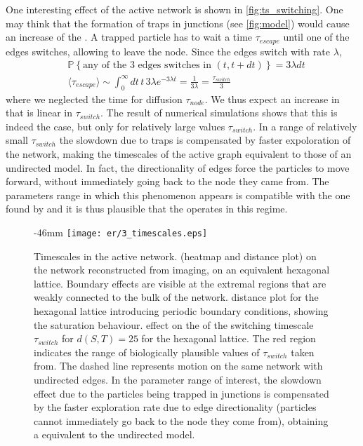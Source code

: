 One interesting effect of the active network is shown in \cref{fig:ts_switching}. One may think that the formation of traps in junctions (see \cref{fig:model}) would cause an increase of the . A trapped particle has to wait a time $\tau_{escape}$ until one of the edges switches, allowing to leave the node. Since the edges switch with rate $\lambda$,
\begin{align}
  &\mathbb{P}\left\{ \text{any of the 3 edges switches in }(t, t + dt)\right\} = 3\lambda dt\\
  &\langle \tau_{escape}\rangle \sim \int_{0}^{\infty} dt \,t\,3\lambda e^{-3\lambda t} = \frac{1}{3\lambda} = \frac{\tau_{switch}}{3}
\end{align}
where we neglected the time for diffusion $\tau_{node}$. We thus expect an increase in  that is linear in $\tau_{switch}$. The result of numerical simulations shows that this is indeed the case, but only for relatively large values $\tau_{switch}$. In a range of relatively small $\tau_{switch}$ the slowdown due to traps is compensated by faster expoloration of the network, making the timescales of the active graph equivalent to those of an undirected model. In fact, the directionality of edges force the particles to move forward, without immediately going back to the node they came from. The parameters range in which this phenomenon appears is compatible with the one found by and it is thus plausible that the  operates in this regime.

\begin{figure}
  \begin{adjustwidth*}{}{-46mm}
    \texttt{[image: er/3\_timescales.eps]}%
    {{\label{fig:ts_er}}%
    {\label{fig:ts_hex}}%
    {\label{fig:ts_hex_pbc}}%
    {\label{fig:ts_switching}}}%
    \caption{Timescales in the active network.
    \enspace {} (heatmap and distance plot) on the network reconstructed from  imaging, \enspace {} on an equivalent hexagonal lattice. Boundary effects are visible at the extremal regions that are weakly connected to the bulk of the network.   distance plot for the hexagonal lattice introducing periodic boundary conditions, showing the saturation behaviour.
    \enspace effect on the  of the switching timescale $\tau_{switch}$ for $d(S, T) = 25$ for the hexagonal lattice. The red region indicates the range of biologically plausible values of $\tau_{switch}$ taken from. The dashed line represents motion on the same network with undirected edges. In the parameter range of interest, the slowdown effect due to the particles being trapped in junctions is compensated by the faster exploration rate due to edge directionality (particles cannot immediately go back to the node they come from), obtaining a  equivalent to the undirected model.\label{fig:ts}}

  \end{adjustwidth*}
\end{figure}

